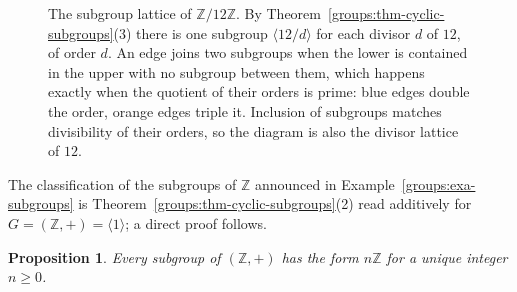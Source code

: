 \documentclass[11pt,a4paper]{article}
\newtheorem{proposition}[theorem]{Proposition}
\theoremstyle{definition}
\theoremstyle{remark}
\newcommand{\Z}{\ensuremath{\mathbb{Z}}}
\begin{document}
\begin{figure}[htbp]
\centering
{}
\caption{The subgroup lattice of \(\Z/12\Z\). By
Theorem~\ref{groups:thm-cyclic-subgroups}(3) there is one subgroup
\(\langle 12/d\rangle\) for each divisor \(d\) of \(12\), of order \(d\).
An edge joins two subgroups when the lower is contained in the upper
with no subgroup between them, which happens exactly when the quotient
of their orders is prime: blue edges double the order, orange edges
triple it. Inclusion of subgroups matches divisibility of their orders,
so the diagram is also the divisor lattice of \(12\).}
\label{fig:groups-z12lattice}
\end{figure}

The classification of the subgroups of \(\Z\) announced in
Example~\ref{groups:exa-subgroups} is
Theorem~\ref{groups:thm-cyclic-subgroups}(2) read additively for
\(G = (\Z,+) = \langle 1\rangle\); a direct proof follows.

\begin{proposition}\label{groups:prop-subgroups-of-Z}
Every subgroup of \((\Z,+)\) has the form \(n\Z\) for a unique integer
\(n \ge 0\).
\end{proposition}
\end{document}
